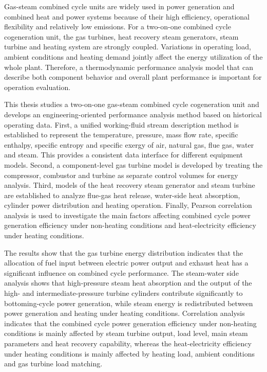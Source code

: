 \begingroup
\setlength{\baselineskip}{20pt}

Gas-steam combined cycle units are widely used in power generation and combined heat and power systems because of their high efficiency, operational flexibility and relatively low emissions. For a two-on-one combined cycle cogeneration unit, the gas turbines, heat recovery steam generators, steam turbine and heating system are strongly coupled. Variations in operating load, ambient conditions and heating demand jointly affect the energy utilization of the whole plant. Therefore, a thermodynamic performance analysis model that can describe both component behavior and overall plant performance is important for operation evaluation.

This thesis studies a two-on-one gas-steam combined cycle cogeneration unit and develops an engineering-oriented performance analysis method based on historical operating data. First, a unified working-fluid stream description method is established to represent the temperature, pressure, mass flow rate, specific enthalpy, specific entropy and specific exergy of air, natural gas, flue gas, water and steam. This provides a consistent data interface for different equipment models. Second, a component-level gas turbine model is developed by treating the compressor, combustor and turbine as separate control volumes for energy analysis. Third, models of the heat recovery steam generator and steam turbine are established to analyze flue-gas heat release, water-side heat absorption, cylinder power distribution and heating operation. Finally, Pearson correlation analysis is used to investigate the main factors affecting combined cycle power generation efficiency under non-heating conditions and heat-electricity efficiency under heating conditions.

The results show that the gas turbine energy distribution indicates that the allocation of fuel input between electric power output and exhaust heat has a significant influence on combined cycle performance. The steam-water side analysis shows that high-pressure steam heat absorption and the output of the high- and intermediate-pressure turbine cylinders contribute significantly to bottoming-cycle power generation, while steam energy is redistributed between power generation and heating under heating conditions. Correlation analysis indicates that the combined cycle power generation efficiency under non-heating conditions is mainly affected by steam turbine output, load level, main steam parameters and heat recovery capability, whereas the heat-electricity efficiency under heating conditions is mainly affected by heating load, ambient conditions and gas turbine load matching.

